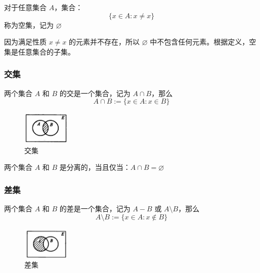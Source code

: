 \begin{definition}[空集 Empty ]
    对于任意集合 $ A $，集合：
    \[
        \{x\in A:x\neq x\} 
    \]
    称为空集，记为 $ \varnothing $
\end{definition}

\begin{note}
因为满足性质 $ x\neq x $ 的元素并不存在，所以 $ \varnothing $ 中不包含任何元素。根据定义，空集是任意集合的子集。
\end{note}
\vspace{1em}

\subsubsection{交集}
\begin{definition}[交集 Intersection]
    两个集合 $ A $ 和 $ B $ 的交是一个集合，记为 $ A\cap  B $，那么
    \[
        A\cap B := \{x\in A : x\in B\} 
    \]
\end{definition}

\begin{figure}[htbp]
    \centering
    \includegraphics[width=0.2\textwidth]{figures/chapter1/chapter1_1} 
    \caption{交集}
    \label{fig:chapter1_1}
\end{figure}
\vspace{1em}

\begin{definition}[分离 Disjoint]
    两个集合 $ A $ 和 $ B $ 是分离的，当且仅当：$ A\cap B = \varnothing $
\end{definition}
\vspace{1em}

\subsubsection{差集}

\begin{definition}[差集 Difference]
    两个集合 $ A $ 和 $ B $ 的差是一个集合，记为 $ A-B $ 或 $ A\setminus B $，那么
    \[
        A\setminus B := \{x\in A:x\notin B\}
    \]
\end{definition}

\begin{figure}[htbp]
    \centering
    \includegraphics[width=0.2\textwidth]{figures/chapter1/chapter1_2} 
    \caption{差集}
    \label{fig:chapter1_2}
\end{figure}

